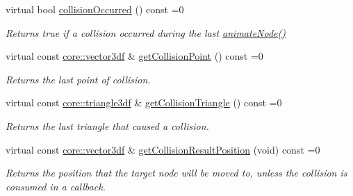 \begin{DoxyCompactItemize}
virtual bool \hyperlink{classirr_1_1scene_1_1ISceneNodeAnimatorCollisionResponse_a8bb04bc4d7de2203879a8392d024f466}{collision\+Occurred} () const =0
\begin{DoxyCompactList}\small\item\em Returns true if a collision occurred during the last \hyperlink{classirr_1_1scene_1_1ISceneNodeAnimator_ab2170d133db16de148d0f6841c06bc84}{animate\+Node()} \end{DoxyCompactList}\item 
\mbox{\label{classirr_1_1scene_1_1ISceneNodeAnimatorCollisionResponse_acb39b68d18f721960ac73dc158968479}} 
virtual const \hyperlink{namespaceirr_1_1core_a06f169d08b5c429f5575acb7edbad811}{core\+::vector3df} \& \hyperlink{classirr_1_1scene_1_1ISceneNodeAnimatorCollisionResponse_acb39b68d18f721960ac73dc158968479}{get\+Collision\+Point} () const =0
\begin{DoxyCompactList}\small\item\em Returns the last point of collision. \end{DoxyCompactList}\item 
\mbox{\label{classirr_1_1scene_1_1ISceneNodeAnimatorCollisionResponse_abb9d0576446a64e9944ef15a04722591}} 
virtual const \hyperlink{namespaceirr_1_1core_a1112835405bbec5dadf031dc7934e7d0}{core\+::triangle3df} \& \hyperlink{classirr_1_1scene_1_1ISceneNodeAnimatorCollisionResponse_abb9d0576446a64e9944ef15a04722591}{get\+Collision\+Triangle} () const =0
\begin{DoxyCompactList}\small\item\em Returns the last triangle that caused a collision. \end{DoxyCompactList}\item 
virtual const \hyperlink{namespaceirr_1_1core_a06f169d08b5c429f5575acb7edbad811}{core\+::vector3df} \& \hyperlink{classirr_1_1scene_1_1ISceneNodeAnimatorCollisionResponse_a788542083dda874c63e278891535a9f4}{get\+Collision\+Result\+Position} (void) const =0
\begin{DoxyCompactList}\small\item\em Returns the position that the target node will be moved to, unless the collision is consumed in a callback. \end{DoxyCompactList}\item 
\mbox{\label{classirr_1_1scene_1_1ISceneNodeAnimatorCollisionResponse_a5a975ddf3d776d6bb4c6d44c36cc74fd}} 

\end{DoxyCompactItemize}
